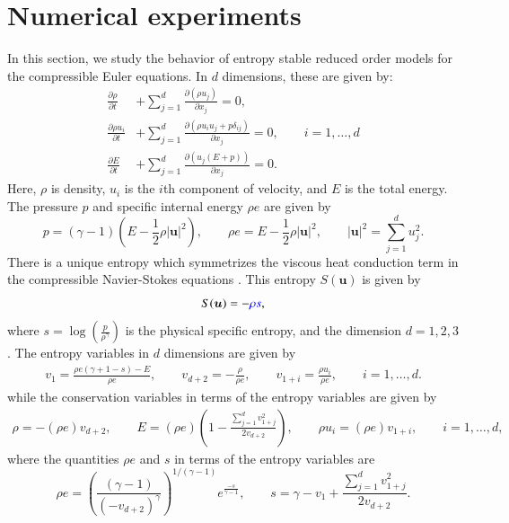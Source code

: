 \documentclass[preprint,10pt]{elsarticle}
\theoremstyle{definition}
\theoremstyle{lemma}
\theoremstyle{theorem}
\theoremstyle{assumption}
\newcommand{\pd}[2]{\frac{\partial#1}{\partial#2}}
\newcommand{\LRp}[1]{\left( #1 \right)}
\newcommand{\LRb}[1]{\left| #1 \right|}
\newcommand{\bnote}[1]{{\color{blue}{#1}}}
\begin{document}
\section{Numerical experiments}
\label{sec:8}
{In this section, we study the behavior of entropy stable reduced order models for} the compressible Euler equations.  In $d$ dimensions, these are given by:
\begin{align*}
\pd{\rho}{t} &+ {\sum_{j=1}^d \pd{\LRp{\rho {u}_j}}{x_j}} = 0,\\
{\pd{\rho {u}_i}{t}} &+ {\sum_{j=1}^d \pd{\LRp{\rho u_iu_j + p\delta_{ij} }}{x_j}} = 0, \qquad i = 1,\ldots,d\\
\pd{E}{t} &+ {\sum_{j=1}^d \pd{\LRp{{u}_j(E+p)}}{x_j}} = 0.\nonumber
\end{align*}
Here, $\rho$ is density, {$u_i$ is the $i$th component of} velocity, and $E$ is the total energy.  The pressure $p$ and specific internal energy $\rho e$ are given by 
\[
{p = (\gamma-1)\LRp{E - \frac{1}{2}\rho \LRb{\bm{u}}^2}}, \qquad {\rho e = E - \frac{1}{2}\rho\LRb{\bm{u}}^2}, \qquad \LRb{\bm{u}}^2 = {\sum_{j=1}^d u_j^2}.
\]
There is a unique entropy which symmetrizes the viscous heat conduction term in the compressible Navier-Stokes equations \cite{hughes1986new}.  This entropy $S(\bm{u})$ is given by
\begin{equation*}
S(\bm{u}) = -\bnote{\rho s}, %
\end{equation*}
where $s = \log\LRp{\frac{p}{\rho^\gamma}}$ is the physical specific entropy, and the dimension $d = 1,2,3$.  The entropy variables in $d$ dimensions are given by
\begin{gather*}
v_1 = \frac{\rho e (\gamma + 1 - s) - E}{\rho e}, \qquad v_{d+2} = -\frac{\rho}{\rho e}, \qquad
v_{1+ i}= \frac{\rho {{u}_i}}{\rho e}, \qquad i = 1,\ldots, d.
\end{gather*}
while the conservation variables in terms of the entropy variables are given by
\begin{gather*}
\rho = -(\rho e) v_{d+2}, \qquad E = (\rho e)\LRp{1 - \frac{\sum_{j=1}^d{v_{1+j}^2}}{2 v_{d+2}}}, \qquad
 \rho {u_i} = (\rho e) v_{1+i}, \qquad i = 1,\ldots,d,
\end{gather*}
where the quantities $\rho e$ and $s$ in terms of the entropy variables are 
\begin{equation*}
\rho e = \LRp{\frac{(\gamma-1)}{\LRp{-v_{d+2}}^{\gamma}}}^{1/(\gamma-1)}e^{\frac{-s}{\gamma-1}}, \qquad s = \gamma - v_1 + \frac{\sum_{j=1}^d{v_{1+j}^2}}{2v_{d+2}}.
\end{equation*}
\end{document}
